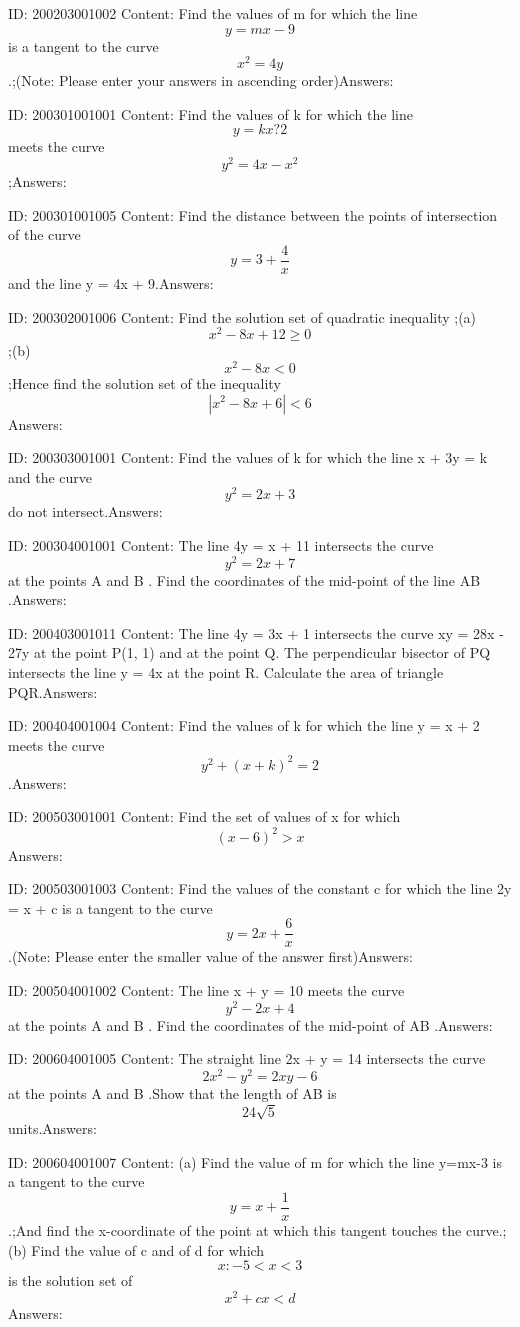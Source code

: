 \documentclass{article}
\begin{document}
ID: 200203001002
Content:
Find the values of m for which the line $$y = mx -9$$ is a tangent to the curve $$x^2=4y$$.;(Note: Please enter your answers in ascending order)Answers:

ID: 200301001001
Content:
Find the values of k for which the line $$y = kx ? 2$$ meets the curve $$y^2=4x-x^2$$;Answers:

ID: 200301001005
Content:
Find the distance between the points of intersection of the curve $$y=3 + \frac{4}{x}$$ and the line y = 4x + 9.Answers:

ID: 200302001006
Content:
Find the solution set of quadratic inequality ;(a) $$x^2-8x+12\geq0$$;(b) $$x^2-8x<0$$;Hence find the solution set of the inequality $$|x^2-8x+6|<6$$Answers:

ID: 200303001001
Content:
Find the values of k for which the line x + 3y = k and the curve $$y^2=2x+3$$ do not intersect.Answers:

ID: 200304001001
Content:
The line 4y = x + 11 intersects the curve $$y^2=2x+7$$ at the points A and B . Find the coordinates of the mid-point of the line AB .Answers:

ID: 200403001011
Content:
The line 4y = 3x + 1 intersects the curve xy = 28x - 27y at the point P(1, 1) and at the point Q. The perpendicular bisector of PQ intersects the line y = 4x at the point R. Calculate the area of triangle PQR.Answers:

ID: 200404001004
Content:
Find the values of k for which the line y = x + 2 meets the curve $$y^2+(x+k)^2=2$$.Answers:

ID: 200503001001
Content:
Find the set of values of x for which $$(x-6)^2>x$$Answers:

ID: 200503001003
Content:
Find the values of the constant c for which the line 2y = x + c is a tangent to the curve $$y=2x+\frac{6}{x}$$.(Note: Please enter the smaller value of the answer first)Answers:

ID: 200504001002
Content:
The line x + y = 10 meets the curve $$y^2-2x+4$$ at the points A and B . Find the coordinates of the mid-point of AB .Answers:

ID: 200604001005
Content:
The straight line 2x + y = 14 intersects the curve $$2x^2-y^2=2xy-6$$ at the points A and B .Show that the length of AB is $$24\sqrt5$$ units.Answers:

ID: 200604001007
Content:
(a)	Find the value of m for which the line y=mx-3 is a tangent to the curve $$y=x+ \frac{1}{x} $$.;And find the x-coordinate of the point at which this tangent touches the curve.;(b)	Find the value of c and of d for which $${x: -5< x<3 }$$ is the solution set of $$x^2+cx<d$$Answers:
\end{document}
